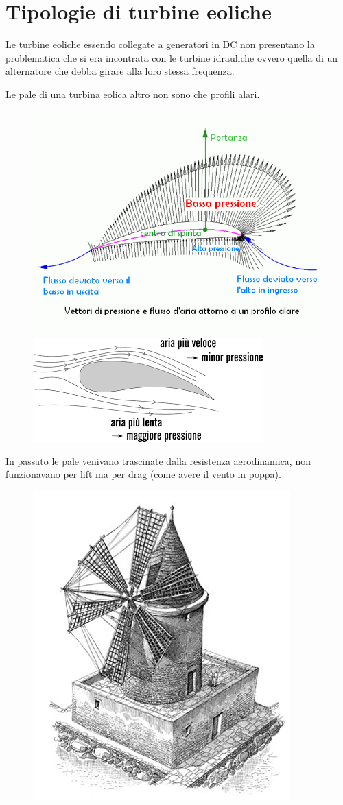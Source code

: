 \documentclass[a4paper, 15pt]{article}
\begin{document}
\section{Tipologie di turbine eoliche}
\begin{adjustwidth}{2in}{}
	Le turbine eoliche essendo collegate a generatori in DC non presentano la problematica che si era incontrata con le turbine idrauliche ovvero quella di un alternatore che debba girare alla loro stessa frequenza. \newline 
	
	Le pale di una turbina eolica altro non sono che profili alari.
	\begin{figure}[H]
		\centering
		\includegraphics[width=0.4\linewidth]{immagini/eoliche1}
		\includegraphics[width=0.4\linewidth]{immagini/eoliche2}
		\label{fig:eoliche1}
		\label{fig:eoliche2}
	\end{figure}
	\newpage
	 In passato le pale venivano trascinate dalla resistenza aerodinamica, non funzionavano per lift ma per drag (come avere il vento in poppa).
	 \begin{figure}[H]
	 	\centering
	 	\includegraphics[width=0.5\linewidth]{immagini/eoliche3}

\end{figure}
\end{adjustwidth}
\end{document}
